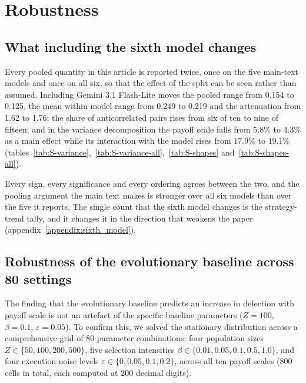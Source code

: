 \documentclass[11pt,a4paper]{article}
\begin{document}
\section{Robustness}\label{appendix:robustness}

\subsection{What including the sixth model changes}\label{appendix:robust_sixth}

Every pooled quantity in this article is reported twice, once on the five main-text models and once on all six, so that the effect of the split can be seen rather than assumed. Including Gemini 3.1 Flash-Lite moves the pooled range from 0.154 to 0.125, the mean within-model range from 0.249 to 0.219 and the attenuation from 1.62 to 1.76; the share of anticorrelated pairs rises from six of ten to nine of fifteen; and in the variance decomposition the payoff scale falls from $5.8\%$ to $4.3\%$ as a main effect while its interaction with the model rises from $17.9\%$ to $19.1\%$ (tables~\ref{tab:S-variance},~\ref{tab:S-variance-all},~\ref{tab:S-shapes} and~\ref{tab:S-shapes-all}).

Every sign, every significance and every ordering agrees between the two, and the pooling argument the main text makes is stronger over all six models than over the five it reports. The single count that the sixth model changes is the strategy-trend tally, and it changes it in the direction that weakens the paper (appendix~\ref{appendix:sixth_model}).

\subsection{Robustness of the evolutionary baseline across 80 settings}\label{appendix:robust_egt}

The finding that the evolutionary baseline predicts an increase in defection with payoff scale is not an artefact of the specific baseline parameters ($Z = 100$, $\beta = 0.1$, $\varepsilon = 0.05$). To confirm this, we solved the stationary distribution across a comprehensive grid of 80 parameter combinations: four population sizes $Z \in \{50, 100, 200, 500\}$, five selection intensities $\beta \in \{0.01, 0.05, 0.1, 0.5, 1.0\}$, and four execution noise levels $\varepsilon \in \{0, 0.05, 0.1, 0.2\}$, across all ten payoff scales (800 cells in total, each computed at 200 decimal digits).
\end{document}

